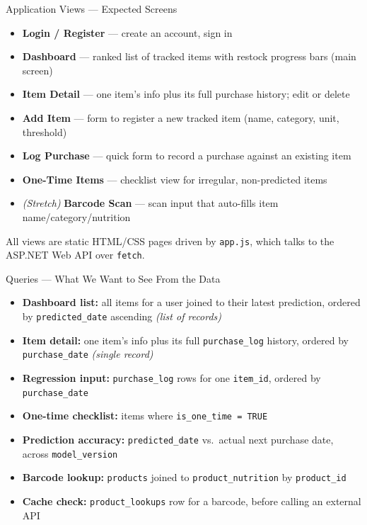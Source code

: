 \documentclass[aspectratio=169]{beamer}
\begin{document}
\begin{frame}{Application Views --- Expected Screens}
  \begin{itemize}
    \item \textbf{Login / Register} --- create an account, sign in
    \item \textbf{Dashboard} --- ranked list of tracked items with restock progress bars (main screen)
    \item \textbf{Item Detail} --- one item's info plus its full purchase history; edit or delete
    \item \textbf{Add Item} --- form to register a new tracked item (name, category, unit, threshold)
    \item \textbf{Log Purchase} --- quick form to record a purchase against an existing item
    \item \textbf{One-Time Items} --- checklist view for irregular, non-predicted items
    \item \emph{(Stretch)} \textbf{Barcode Scan} --- scan input that auto-fills item name/category/nutrition
  \end{itemize}
  \vspace{4pt}
  \small All views are static HTML/CSS pages driven by \texttt{app.js}, which talks to the ASP.NET Web API over \texttt{fetch}.
\end{frame}

\begin{frame}{Queries --- What We Want to See From the Data}
  \begin{itemize}
    \item \textbf{Dashboard list:} all items for a user joined to their latest prediction, ordered by \texttt{predicted\_date} ascending \hfill \emph{(list of records)}
    \item \textbf{Item detail:} one item's info plus its full \texttt{purchase\_log} history, ordered by \texttt{purchase\_date} \hfill \emph{(single record)}
    \item \textbf{Regression input:} \texttt{purchase\_log} rows for one \texttt{item\_id}, ordered by \texttt{purchase\_date}
    \item \textbf{One-time checklist:} items where \texttt{is\_one\_time = TRUE}
    \item \textbf{Prediction accuracy:} \texttt{predicted\_date} vs.\ actual next purchase date, across \texttt{model\_version}
    \item \textbf{Barcode lookup:} \texttt{products} joined to \texttt{product\_nutrition} by \texttt{product\_id}
    \item \textbf{Cache check:} \texttt{product\_lookups} row for a barcode, before calling an external API
  \end{itemize}
\end{frame}
\end{document}
